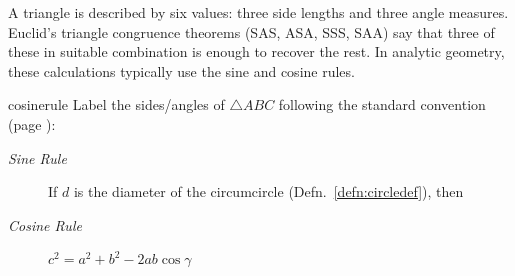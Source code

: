 \goodbreak



A triangle is described by six values: three side lengths and three angle measures. Euclid's triangle congruence theorems (SAS, ASA, SSS, SAA) say that three of these in suitable combination is enough to recover the rest. In analytic geometry, these calculations typically use the sine and cosine rules.

\begin{thm}{}{cosinerule}
	Label the sides/angles of $\triangle ABC$ following the standard convention (page \pageref{sec:analyticangle}):
	\begin{description}
		\item[\normalfont\emph{Sine Rule}] If $d$ is the diameter of the circumcircle (Defn.\ \ref{defn:circledef}), then \ 
		\item[\normalfont\emph{Cosine Rule}] $c^2=a^2+b^2-2ab\cos\gamma$
	\end{description}
\end{thm}


